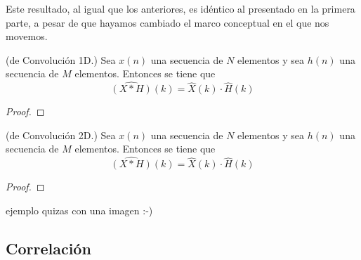 \noindent Este resultado, al igual que los anteriores, es idéntico al presentado en la primera parte, a pesar de que hayamos cambiado el marco conceptual en el que nos movemos.


\begin{teorema}{(de Convolución 1D.)}
Sea \( x(n) \) una secuencia de \( N \) elementos y sea \( h(n) \) una secuencia de \( M \) elementos. Entonces se tiene que  
 \[
\widehat{(X*H)}(k) = \widehat{X}(k) \cdot \widehat{H}(k)
\]

\end{teorema}

\begin{proof}
\end{proof}

\begin{teorema}{(de Convolución 2D.)}
Sea \( x(n) \) una secuencia de \( N \) elementos y sea \( h(n) \) una secuencia de \( M \) elementos. Entonces se tiene que  
 \[
\widehat{(X*H)}(k) = \widehat{X}(k) \cdot \widehat{H}(k)
\]

\end{teorema}

\begin{proof}
\end{proof}



ejemplo quizas con una imagen :-)

\subsection{Correlación}






























\endinput

